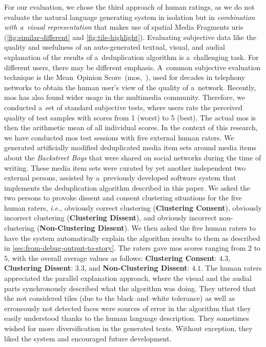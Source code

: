 \documentclass{article}
\begin{document}
For our evaluation, we chose the third approach of human ratings, as we do not evaluate the natural language generating system in isolation but in \emph{combination with a~visual representation} that makes use of spatial Media Fragments {\sc uri}s (\autoref{fig:similar-different} and \autoref{fig:tile-highlight}). Evaluating subjective data like the quality and usefulness of an auto-generated textual, visual, and audial explanation of the results of a~deduplication algorithm is a~challenging task. For different users, there may be different emphasis. A~common subjective evaluation technique
is the Mean~Opinion Score~({\sc mos},~\cite{itu1998mos}), used for decades in telephony networks to obtain the human user's view of the quality of a~network.
Recently, {\sc mos} has also found wider usage in the multimedia community. Therefore, we conducted a~set of standard subjective tests, where users rate the perceived quality of test samples with scores from 1 (worst) to 5 (best). The actual {\sc mos} is then the arithmetic mean of all individual scores. In the context of this research, we have conducted {\sc mos} test sessions with five external human raters. We generated artificially modified deduplicated media item sets around media items about the \emph{Backstreet Boys} that were shared on social networks during the time of writing. These media item sets were curated by yet another independent two external persons, assisted by a~previously developed software system that implements the deduplication algorithm described in this paper. We asked the two persons to provoke dissent and consent clustering situations for the five human raters, \emph{i.e.}, obviously correct clustering (\textbf{Clustering Consent}), obviously incorrect clustering (\textbf{Clustering Dissent}), and obviously incorrect non-clustering (\textbf{Non-Clustering Dissent}). We then asked the five human raters to have the system automatically explain the algorithm results to them as described in \autoref{sec:from-debug-output-to-story}. The raters gave {\sc mos} scores ranging from $2$ to $5$, with the overall average values as follows: \textbf{Clustering Consent}: $4.3$, \textbf{Clustering Dissent}: $3.3$, and \textbf{Non-Clustering Dissent}: $4.1$. The human raters appreciated the parallel explanation approach, where the visual and the audial parts synchronously described what the algorithm was doing. They uttered that the not considered tiles (due to the black--and--white tolerance) as well as erroneously not detected faces were sources of error in the algorithm that they easily understood thanks to the human language description. They sometimes wished for more diversification in the generated texts. Without exception, they liked the system and encouraged future development.
\end{document}
